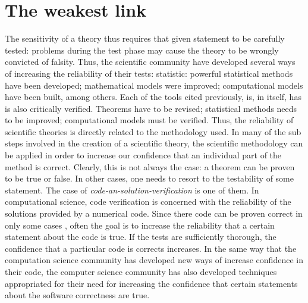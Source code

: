 \section{The weakest link}


The sensitivity of a theory thus requires that given statement to be carefully tested: problems during the test phase may cause the theory to be wrongly convicted of falsity. Thus, the scientific community have developed several ways of increasing the reliability of their tests: statistic: powerful statistical methods have been developed; mathematical models were improved; computational models have been built, among others.  Each of the tools cited previously, is, in itself, has is also critically verified. Theorems have to be revised; statistical methods needs to be improved; computational models must be verified.  Thus, the reliability of scientific theories is directly related to the methodology used. In many of the sub steps involved in the creation of a scientific theory, the scientific methodology can be applied in order to increase our confidence that an individual part of the method is correct. Clearly, this is not always the case: a theorem can be proven to be true or false. 
In other cases, one needs to resort to the testability of some statement. The case of \emph{code-an-solution-verification} is one of them.  In computational science, code verification is concerned with the reliability of the solutions provided by a numerical code. Since there code can be proven correct in only some cases \cite{citation-needed}, often the goal is to increase the reliability that a certain statement about the code is true. If the tests are sufficiently thorough, the confidence that a particular code is corrects increases. In the same way that the computation science community has developed new ways of increase confidence in their code, the computer science community has also developed techniques appropriated for their need for increasing the confidence that certain statements about the software correctness are true.

